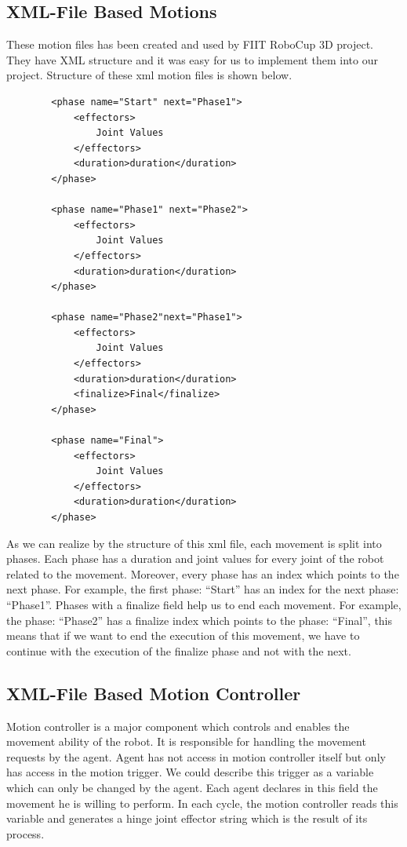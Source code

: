 \subsection{XML-File Based Motions}
These motion files has been created and used by FIIT RoboCup 3D project. They have XML structure and it was easy for us to implement them into our project. Structure of these xml motion files is shown below.
\begin{verbatim}
		<phase name="Start" next="Phase1">
			<effectors>
				Joint Values
			</effectors>
			<duration>duration</duration>
		</phase>
		
		<phase name="Phase1" next="Phase2">
			<effectors>
				Joint Values
			</effectors>
			<duration>duration</duration>
		</phase>
		
		<phase name="Phase2"next="Phase1">
			<effectors>
				Joint Values
			</effectors>
			<duration>duration</duration>
			<finalize>Final</finalize>
		</phase>
		
		<phase name="Final">
			<effectors>
				Joint Values
			</effectors>
			<duration>duration</duration>
		</phase>
\end{verbatim}
As we can realize by the structure of this xml file, each movement is split into phases. Each phase has a duration and joint values for every joint of the robot related to the movement. Moreover, every phase has an index which points to the next phase. For example, the first phase: ``Start'' has an index for the next phase: ``Phase1''. Phases with a finalize field help us to end each movement. For example, the phase: ``Phase2'' has a finalize index which points to the phase: ``Final'', this means that if we want to end the execution of this movement, we have to continue with the execution of the finalize phase and not with the next.
\subsection{XML-File Based Motion Controller}
Motion controller is a major component which controls and enables the movement ability of the robot. It is responsible for handling the movement requests by the agent. Agent has not access in motion controller itself but only has access in the motion trigger. We could describe this trigger as a variable which can only be changed by the agent. Each agent declares in this field the movement he is willing to perform. In each cycle, the motion controller reads this variable and generates a hinge joint effector string which is the result of its process.


